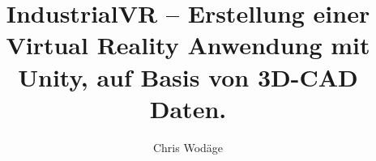 

\newcommand{\sieheKapitel}[1]{\glqq {#1}\grqq}
\newcommand{\sieheAbbVerweis}[2]{(siehe Abb. {#1} -- {#2})}
\newcommand{\sieheAbb}[1]{(siehe Abb. {#1})}
\newcommand{\sieheCA}[1]{(siehe Codeauszug {#1})}

\usepackage{chngcntr}
\usepackage[format=plain, justification=RaggedRight, singlelinecheck=false]{caption}

\logoPathL{} %
\gradeType{}
\secondExaminer{}

%

\title{IndustrialVR -- Erstellung einer Virtual Reality Anwendung mit Unity, auf Basis von 3D-CAD Daten.}
\author{Chris Wodäge}

\makeindex[title=Stichwortverzeichnis, options=-s indexstyle.ist, intoc]

\makeglossaries
{}



\maketitle



\null\thispagestyle{empty}

 

\listoffigures \clearpage
\tableofcontents \newpage




 \clearpage
 \clearpage
 \clearpage
 \clearpage
 \clearpage

